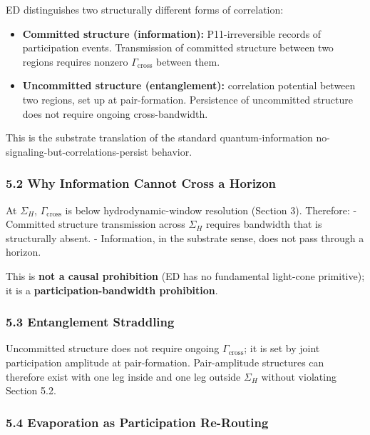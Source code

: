 \documentclass[
  11pt,
  a4paper,
]{article}
\providecommand{\tightlist}{%
  \setlength{\itemsep}{0pt}\setlength{\parskip}{0pt}}
\begin{document}
ED distinguishes two structurally different forms of correlation:

\begin{itemize}
\tightlist
\item
  \textbf{Committed structure (information):} P11-irreversible records
  of participation events. Transmission of committed structure between
  two regions requires nonzero \(\Gamma_\mathrm{cross}\) between them.
\item
  \textbf{Uncommitted structure (entanglement):} correlation potential
  between two regions, set up at pair-formation. Persistence of
  uncommitted structure does not require ongoing cross-bandwidth.
\end{itemize}

This is the substrate translation of the standard quantum-information
no-signaling-but-correlations-persist behavior.

\subsubsection{5.2 Why Information Cannot Cross a
Horizon}\label{why-information-cannot-cross-a-horizon}

At \(\Sigma_H\), \(\Gamma_\mathrm{cross}\) is below hydrodynamic-window
resolution (Section 3). Therefore: - Committed structure transmission
across \(\Sigma_H\) requires bandwidth that is structurally absent. -
Information, in the substrate sense, does not pass through a horizon.

This is \textbf{not a causal prohibition} (ED has no fundamental
light-cone primitive); it is a \textbf{participation-bandwidth
prohibition}.

\subsubsection{5.3 Entanglement
Straddling}\label{entanglement-straddling}

Uncommitted structure does not require ongoing
\(\Gamma_\mathrm{cross}\); it is set by joint participation amplitude at
pair-formation. Pair-amplitude structures can therefore exist with one
leg inside and one leg outside \(\Sigma_H\) without violating Section
5.2.

\subsubsection{5.4 Evaporation as Participation
Re-Routing}\label{evaporation-as-participation-re-routing}
\end{document}
